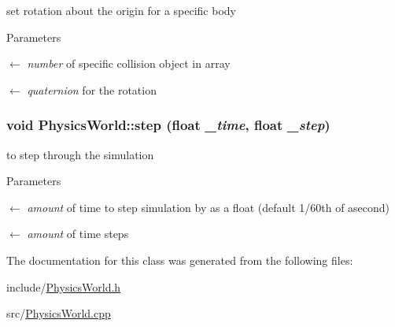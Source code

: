 set rotation about the origin for a specific body 
\begin{DoxyParams}{Parameters}
\item[\mbox{$\leftarrow$} {\em number}]of specific collision object in array \item[\mbox{$\leftarrow$} {\em quaternion}]for the rotation \end{DoxyParams}
\hypertarget{classPhysicsWorld_a7c77049c55dd34a22437e961dbcf92bc}{
\subsubsection[{step}]{\setlength{\rightskip}{0pt plus 5cm}void PhysicsWorld::step (float {\em \_\-time}, \/  float {\em \_\-step})}}
\label{classPhysicsWorld_a7c77049c55dd34a22437e961dbcf92bc}


to step through the simulation 
\begin{DoxyParams}{Parameters}
\item[\mbox{$\leftarrow$} {\em amount}]of time to step simulation by as a float (default 1/60th of asecond) \item[\mbox{$\leftarrow$} {\em amount}]of time steps \end{DoxyParams}


The documentation for this class was generated from the following files:\begin{DoxyCompactItemize}
\item 
include/\hyperlink{PhysicsWorld_8h}{PhysicsWorld.h}\item 
src/\hyperlink{PhysicsWorld_8cpp}{PhysicsWorld.cpp}\end{DoxyCompactItemize}
